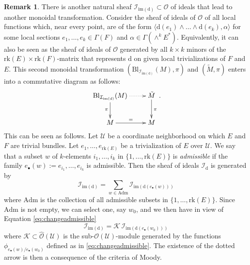 \documentclass[10pt]{article}
\theoremstyle{plain}
\theoremstyle{definition}
\newtheorem{remark}[lemma]{Remark}
\theoremstyle{remark}
\newcommand{\dd}{\mathrm{d}}
\begin{document}
\begin{remark}
There is another natural sheaf  $ \mathcal I_{\mathrm{im}(\dd)} \subset \mathcal O$  of ideals that lead to another monoidal transformation. Consider the sheaf of ideals of $ \mathcal O$  of all local functions which, near every point, are of the form $ \langle \dd (e_1 ) \wedge \dots \wedge\dd (e_k), \alpha \rangle$ for some local sections $ e_1, \dots, e_k \in \Gamma(F)$ and $ \alpha \in \Gamma(\wedge^k E^*) $. Equivalently, it can also be seen as the sheaf of ideals of $\mathcal O $ generated by all $ k \times k$ minors of the $ {\mathrm{rk}}(E) \times {\mathrm{rk}}(F)$-matrix that represents $\dd$ on given local trivializations of $F$ and $E$.  This second monoidal transformation $(\mathrm{Bl}_{\mathcal I_{\mathrm{im}(\dd)}}(M), \pi) $ and $(\tilde{M} ,\pi)$ enters into a commutative diagram as follows: \begin{equation}\label{dia:dottedarrow2}  \xymatrix{  \mathrm{Bl}_{\mathcal I_{\mathrm{im}(\dd)}}(M) \ar@{.>}[r]\ar[d]_\pi&\ar[d]^\pi \tilde{M}\\ M \ar[r]^{=}& M } .  \end{equation}  
This can be seen as follows. Let $ \mathcal U$ be a coordinate neighborhood on which $E $ and $F$ are trivial bundles. Let $ e_1, \dots, e_{\mathrm{rk}(E)}$ be a trivialization of $E$ over $ \mathcal U$. We say that a subset $w$ of $k$-elements $ i_1, \dots, i_k$  in $ \{1, \dots,{\mathrm{rk}(E)} \}$ is \emph{admissible} if the family $e_\bullet(w) :=  e_{i_1}, \dots, e_{i_k}$ is admissible.  
  Then the sheaf of ideals $ \mathcal I_\dd$ is generated by
   $$   \mathcal I_{\mathrm{im}(\dd)} = \sum_{w \in \mathrm{Adm}} \mathcal I_{\mathrm{im}(\dd(e_\bullet(w)))}  $$
   where $\mathrm{Adm}$ is the collection of all admissible subsets in $ \{1, \dots,{\mathrm{rk}(E)} \}$. Since $ \mathrm{Adm} $
 is not empty, we can select one, say $ w_0$, and we then have  in view of Equation \eqref{eq:changeadmissible}
 $$  \mathcal I_{\mathrm{im}(\dd)}  =  \mathcal K \,  \mathcal I_{\mathrm{im}(\dd(e_\bullet(w_0)))}  $$
 where $ \mathcal K \subset \hat{\mathcal O}(\mathcal U)$ is the sub-$ \mathcal O(\mathcal U)$-module generated by the functions $ \phi_{ e_\bullet ( w) / e_\bullet ( w_0) } $ defined as in \eqref{eq:changeadmissible}. The existence of the dotted arrow is then a consequence of the criteria of Moody.
 \end{remark}
\end{document}
